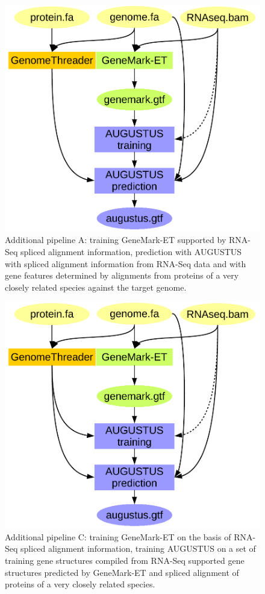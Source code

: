 \documentclass[]{article}
\begin{document}
\begin{itemize}
  \begin{figure}
  \centering
  \includegraphics{./figs/braker2.pdf}
  \caption{Additional pipeline A: training GeneMark-ET supported by
  RNA-Seq spliced alignment information, prediction with AUGUSTUS with
  spliced alignment information from RNA-Seq data and with gene features
  determined by alignments from proteins of a very closely related
  species against the target genome.\label{braker2-sidetrack-a}}
  \end{figure}

  \begin{figure}
  \centering
  \includegraphics{./figs/braker2_train_from_both.pdf}
  \caption{Additional pipeline C: training GeneMark-ET on the basis of
  RNA-Seq spliced alignment information, training AUGUSTUS on a set of
  training gene structures compiled from RNA-Seq supported gene
  structures predicted by GeneMark-ET and spliced alignment of proteins
  of a very closely related species.\label{braker2-sidetrack-c}}
  \end{figure}
\end{itemize}
\end{document}
